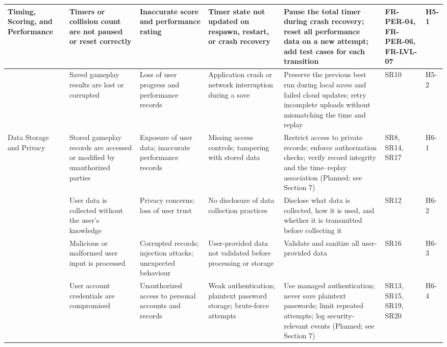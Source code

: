 \documentclass{article}
\newcommand{\reqref}[1]{#1}
\begin{document}
\begin{landscape}
\begin{longtable}{|L{1.9cm}|L{2.6cm}|L{3.0cm}|L{2.8cm}|L{3.8cm}|L{1.9cm}|L{0.8cm}|}
Timing, Scoring, and Performance &
Timers or collision count are not paused or reset correctly &
Inaccurate score and performance rating &
Timer state not updated on respawn, restart, or crash recovery &
Pause the total timer during crash recovery; reset all performance data on a
new attempt; add test cases for each transition &
FR-PER-04, FR-PER-06, FR-LVL-07 &
H5-1 \\
\hline
&
Saved gameplay results are lost or corrupted &
Loss of user progress and performance records &
Application crash or network interruption during a save &
Preserve the previous best run during local saves and failed cloud updates;
retry incomplete uploads without mismatching the time and replay &
\reqref{SR10} &
H5-2 \\
\hline

Data Storage and Privacy &
Stored gameplay records are accessed or modified by unauthorized parties &
Exposure of user data; inaccurate performance records &
Missing access controls; tampering with stored data &
Restrict access to private records; enforce authorization checks; verify
record integrity and the time--replay association (Planned; see Section 7) &
\reqref{SR8}, \reqref{SR14}, \reqref{SR17} &
H6-1 \\
\hline
&
User data is collected without the user's knowledge &
Privacy concerns; loss of user trust &
No disclosure of data collection practices &
Disclose what data is collected, how it is used, and whether it is transmitted
before collecting it &
\reqref{SR12} &
H6-2 \\
\hline
&
Malicious or malformed user input is processed &
Corrupted records; injection attacks; unexpected behaviour &
User-provided data not validated before processing or storage &
Validate and sanitize all user-provided data &
\reqref{SR16} &
H6-3 \\
\hline
&
User account credentials are compromised &
Unauthorized access to personal accounts and records &
Weak authentication; plaintext password storage; brute-force attempts &
Use managed authentication; never save plaintext passwords; limit repeated
attempts; log security-relevant events (Planned; see Section 7) &
\reqref{SR13}, \reqref{SR15}, \reqref{SR19}, \reqref{SR20} &
H6-4 \\
\hline


\end{longtable}
\end{landscape}
\end{document}
